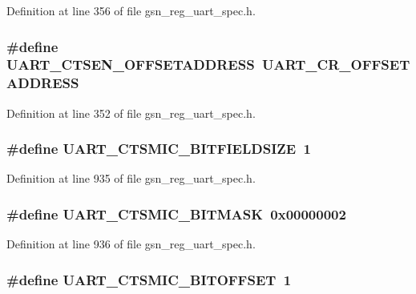 Definition at line 356 of file gsn\_\-reg\_\-uart\_\-spec.h.

\hypertarget{a00575_a44f8e4dcc23f238b9323ddf7aae549e9}{
\subsubsection[{UART\_\-CTSEN\_\-OFFSETADDRESS}]{\setlength{\rightskip}{0pt plus 5cm}\#define UART\_\-CTSEN\_\-OFFSETADDRESS~UART\_\-CR\_\-OFFSETADDRESS}}
\label{a00575_a44f8e4dcc23f238b9323ddf7aae549e9}


Definition at line 352 of file gsn\_\-reg\_\-uart\_\-spec.h.

\hypertarget{a00575_ab7d70ff144eb705d54e6daa0e3024548}{
\subsubsection[{UART\_\-CTSMIC\_\-BITFIELDSIZE}]{\setlength{\rightskip}{0pt plus 5cm}\#define UART\_\-CTSMIC\_\-BITFIELDSIZE~1}}
\label{a00575_ab7d70ff144eb705d54e6daa0e3024548}


Definition at line 935 of file gsn\_\-reg\_\-uart\_\-spec.h.

\hypertarget{a00575_aaf3ebfb4100aa65ae0b0f098e7f99f6e}{
\subsubsection[{UART\_\-CTSMIC\_\-BITMASK}]{\setlength{\rightskip}{0pt plus 5cm}\#define UART\_\-CTSMIC\_\-BITMASK~0x00000002}}
\label{a00575_aaf3ebfb4100aa65ae0b0f098e7f99f6e}


Definition at line 936 of file gsn\_\-reg\_\-uart\_\-spec.h.

\hypertarget{a00575_a51c8f336a3f978ebf1e0e982993f875c}{
\subsubsection[{UART\_\-CTSMIC\_\-BITOFFSET}]{\setlength{\rightskip}{0pt plus 5cm}\#define UART\_\-CTSMIC\_\-BITOFFSET~1}}
\label{a00575_a51c8f336a3f978ebf1e0e982993f875c}


